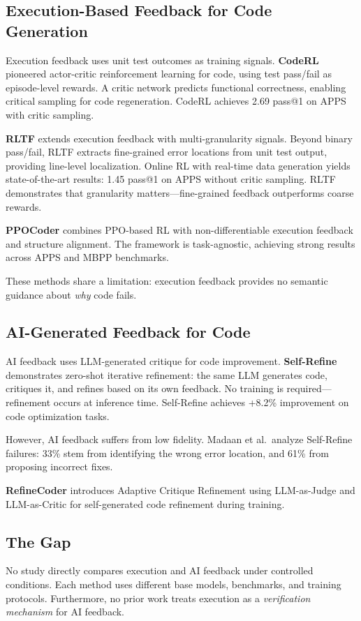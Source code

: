
\subsection{Execution-Based Feedback for Code Generation}

Execution feedback uses unit test outcomes as training signals. \textbf{CodeRL} \citep{le2022coderl} pioneered actor-critic reinforcement learning for code, using test pass/fail as episode-level rewards. A critic network predicts functional correctness, enabling critical sampling for code regeneration. CodeRL achieves 2.69 pass@1 on APPS with critic sampling.

\textbf{RLTF} \citep{liu2023rltf} extends execution feedback with multi-granularity signals. Beyond binary pass/fail, RLTF extracts fine-grained error locations from unit test output, providing line-level localization. Online RL with real-time data generation yields state-of-the-art results: 1.45 pass@1 on APPS without critic sampling. RLTF demonstrates that granularity matters---fine-grained feedback outperforms coarse rewards.

\textbf{PPOCoder} \citep{shojaee2023ppocoder} combines PPO-based RL with non-differentiable execution feedback and structure alignment. The framework is task-agnostic, achieving strong results across APPS and MBPP benchmarks.

These methods share a limitation: execution feedback provides no semantic guidance about \emph{why} code fails.

\subsection{AI-Generated Feedback for Code}

AI feedback uses LLM-generated critique for code improvement. \textbf{Self-Refine} \citep{madaan2023selfrefine} demonstrates zero-shot iterative refinement: the same LLM generates code, critiques it, and refines based on its own feedback. No training is required---refinement occurs at inference time. Self-Refine achieves +8.2\% improvement on code optimization tasks.

However, AI feedback suffers from low fidelity. Madaan et al.\ analyze Self-Refine failures: 33\% stem from identifying the wrong error location, and 61\% from proposing incorrect fixes.

\textbf{RefineCoder} \citep{zhou2025refinecoder} introduces Adaptive Critique Refinement using LLM-as-Judge and LLM-as-Critic for self-generated code refinement during training.

\subsection{The Gap}

No study directly compares execution and AI feedback under controlled conditions. Each method uses different base models, benchmarks, and training protocols. Furthermore, no prior work treats execution as a \emph{verification mechanism} for AI feedback.
